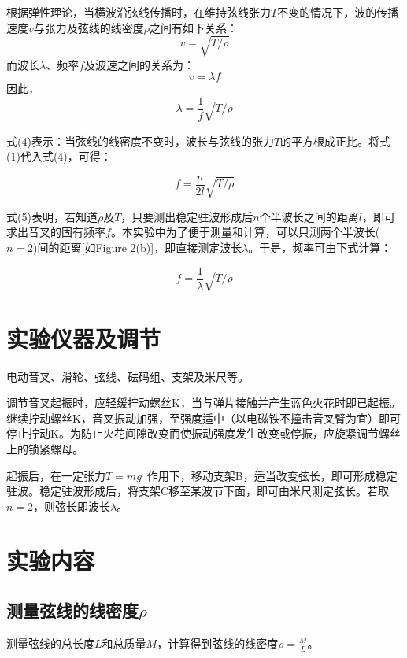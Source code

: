 \documentclass{article}
\begin{document}
根据弹性理论，当横波沿弦线传播时，在维持弦线张力\(T\)不变的情况下，波的传播速度\(v\)与张力及弦线的线密度\(\rho\)之间有如下关系：
\begin{equation}
v = \sqrt{T / \rho}
\end{equation}
而波长\(\lambda\)、频率\(f\)及波速之间的关系为：
\begin{equation}
v = \lambda f
\end{equation}
因此，
\begin{equation}
\lambda = \frac{1}{f}\sqrt{T / \rho}
\end{equation}

式(4)表示：当弦线的线密度不变时，波长与弦线的张力\(T\)的平方根成正比。将式(1)代入式(4)，可得：

\begin{equation}
f = \frac{n}{2l}\sqrt{T / \rho}
\end{equation}

式(5)表明，若知道\(\rho\)及\(T\)，只要测出稳定驻波形成后\(n\)个半波长之间的距离\(l\)，即可求出音叉的固有频率\(f\)。本实验中为了便于测量和计算，可以只测两个半波长(\(n = 2\))间的距离[如Figure 2(b)]，即直接测定波长\(\lambda\)。于是，频率可由下式计算：

\begin{equation}
f = \frac{1}{\lambda}\sqrt{T / \rho}
\end{equation}

\section{实验仪器及调节}
电动音叉、滑轮、弦线、砝码组、支架及米尺等。

调节音叉起振时，应轻缓拧动螺丝K，当与弹片接触并产生蓝色火花时即已起振。继续拧动螺丝K，音叉振动加强，至强度适中（以电磁铁不撞击音叉臂为宜）即可停止拧动K。为防止火花间隙改变而使振动强度发生改变或停振，应旋紧调节螺丝上的锁紧螺母。

起振后，在一定张力\(T = mg\) 作用下，移动支架B，适当改变弦长，即可形成稳定驻波。稳定驻波形成后，将支架C移至某波节下面，即可由米尺测定弦长。若取\(n = 2\)，则弦长即波长\(\lambda\)。

\section{实验内容}
\subsection{测量弦线的线密度$\rho$}
测量弦线的总长度$L$和总质量$M$，计算得到弦线的线密度$\rho=\frac{M}{L}$。
\end{document}

